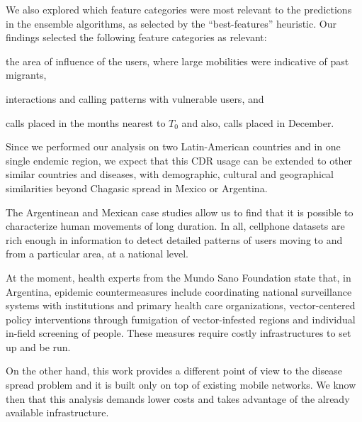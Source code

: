 We also explored which feature categories were most relevant to the predictions in the ensemble algorithms, as selected by the ``best-features'' heuristic.
Our findings selected the following feature categories as relevant:
\begin{enumerate*}[label={\alph*)},]
\item the area of influence of the users, where large mobilities were indicative of past migrants, 
\item interactions and calling patterns with vulnerable users, and
\item calls placed in the months nearest to $T_0$ and also, calls placed in December.
\end{enumerate*}




Since we performed our analysis on two Latin-American countries and in one single endemic region, we expect that this CDR usage can be extended to other similar countries and diseases, with demographic, cultural and geographical similarities beyond Chagasic spread in Mexico or Argentina.

The Argentinean and Mexican case studies allow us to find that it is possible to characterize human movements of long duration.
In all, cellphone datasets are rich enough in information to detect detailed patterns of users moving to and from a particular area, at a national level.


At the moment, health experts from the Mundo Sano Foundation state that, in Argentina, epidemic countermeasures include coordinating national surveillance systems with institutions and primary health care organizations, vector-centered policy interventions through fumigation of vector-infested regions and individual in-field screening of people.
These measures require costly infrastructures to set up and be run.

On the other hand, this work provides a different point of view to the disease spread problem and it is built only on top of existing mobile networks.
We know then that this analysis demands lower costs and takes advantage of the already available infrastructure.

